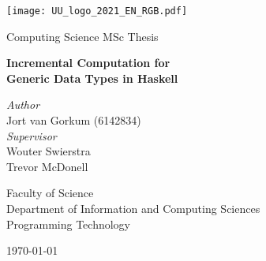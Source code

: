 \begin{titlepage}
  \fontsize{12pt}{15pt}\selectfont
  \begin{center}
    \vspace*{\fill}
    \texttt{[image: UU\_logo\_2021\_EN\_RGB.pdf]}

    \vspace{1.25cm}

    Computing Science MSc Thesis

    \vspace{0.75cm}

    {
      \fontsize{20.74pt}{20.74pt}\selectfont
      \parbox[]{13cm} {
        \centering
        \textbf{Incremental Computation for \\ Generic Data Types in Haskell}
      }
    }
      
    \vspace{2.5cm}
    
    \begin{multicols}{2}
      \textit{Author} \\
      Jort van Gorkum (6142834) \\
    \columnbreak
      \textit{Supervisor} \\
      Wouter Swierstra \\
      Trevor McDonell \\
    \end{multicols}

    
    \vspace{2.5cm}

    Faculty of Science \\
    Department of Information and Computing Sciences \\
    Programming Technology \\
    
    \vspace{1.5cm}

    \monthyeardate\today
  \end{center}
\end{titlepage}